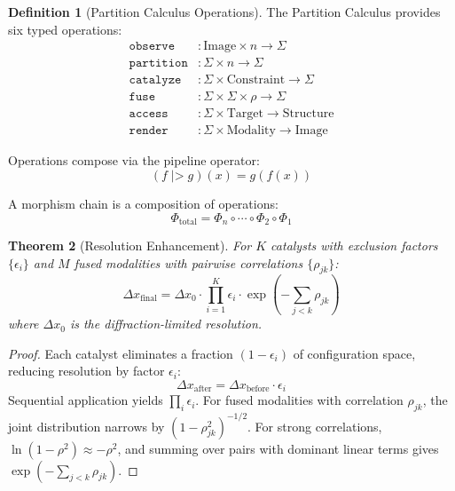 \documentclass[11pt,a4paper]{article}
\newtheorem{theorem}{Theorem}[section]
\theoremstyle{definition}
\newtheorem{definition}[theorem]{Definition}
\theoremstyle{remark}
\newcommand{\Sig}{\Sigma}
\newcommand{\morphism}{\Phi}
\begin{document}
\begin{definition}[Partition Calculus Operations]
\label{def:operations}
The Partition Calculus provides six typed operations:
\begin{align}
\texttt{observe} &: \mathrm{Image} \times n \to \Sig \\
\texttt{partition} &: \Sig \times n \to \Sig \\
\texttt{catalyze} &: \Sig \times \mathrm{Constraint} \to \Sig \\
\texttt{fuse} &: \Sig \times \Sig \times \rho \to \Sig \\
\texttt{access} &: \Sig \times \mathrm{Target} \to \mathrm{Structure} \\
\texttt{render} &: \Sig \times \mathrm{Modality} \to \mathrm{Image}
\end{align}
\end{definition}

Operations compose via the pipeline operator:
\begin{equation}
(f \; \texttt{|>} \; g)(x) = g(f(x))
\end{equation}

A morphism chain is a composition of operations:
\begin{equation}
\morphism_{\mathrm{total}} = \morphism_n \circ \cdots \circ \morphism_2 \circ \morphism_1
\end{equation}

\begin{theorem}[Resolution Enhancement]
\label{thm:resolution}
For $K$ catalysts with exclusion factors $\{\epsilon_i\}$ and $M$ fused modalities with pairwise correlations $\{\rho_{jk}\}$:
\begin{equation}
\Delta x_{\mathrm{final}} = \Delta x_0 \cdot \prod_{i=1}^{K} \epsilon_i \cdot \exp\left(-\sum_{j<k} \rho_{jk}\right)
\end{equation}
where $\Delta x_0$ is the diffraction-limited resolution.
\end{theorem}

\begin{proof}
Each catalyst eliminates a fraction $(1 - \epsilon_i)$ of configuration space, reducing resolution by factor $\epsilon_i$:
\begin{equation}
\Delta x_{\mathrm{after}} = \Delta x_{\mathrm{before}} \cdot \epsilon_i
\end{equation}
Sequential application yields $\prod_i \epsilon_i$. For fused modalities with correlation $\rho_{jk}$, the joint distribution narrows by $(1 - \rho_{jk}^2)^{-1/2}$. For strong correlations, $\ln(1 - \rho^2) \approx -\rho^2$, and summing over pairs with dominant linear terms gives $\exp(-\sum_{j<k} \rho_{jk})$.
\end{proof}
\end{document}

